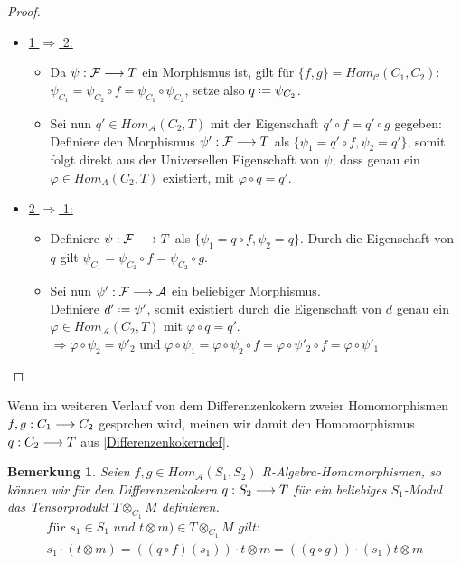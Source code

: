 \documentclass[10pt,a4paper]{report}
\newcounter{Aussage}[chapter]
\newtheorem{bem}[Aussage]{Bemerkung}
\newcommand{\functionfront}[3]{\nolinebreak{#1:#2 \longrightarrow #3}}
\newcommand{\Tensor}[3]{#1 \otimes_{#2} #3}
\newcommand{\tensor}[3]{#1 \otimes #3}
\newcommand*{\defeq}{\mathrel{\vcenter{\baselineskip0.5ex \lineskiplimit0pt
                     \hbox{\scriptsize.}\hbox{\scriptsize.}}}%
                     =}
\begin{document}
\begin{proof}
\ \\
\begin{itemize}
\item \underline{1 $\Rightarrow$ 2:}
\begin{itemize}
\item[] Da $\functionfront{\psi}{\mathcal{F}}{T}$ ein Morphismus ist, gilt für $\lbrace f,g \rbrace = Hom_{\mathcal{C}}(C_1,C_2)$:\\ $\psi_{C_1} = \psi_{C_2} \circ f = \psi_{C_1} \circ \psi_{C_2}$, setze also 
 $q  \defeq \psi_{C_2}$.
\item[] Sei nun $q' \in Hom_{\mathcal{A}}(C_2,T)$ mit der Eigenschaft $q' \circ f = q' \circ g$ gegeben:\\
 Definiere den Morphismus $\functionfront{\psi '}{\mathcal{F}}{T}$ als $\lbrace \psi_1 = q' \circ f , \psi_2 = q' \rbrace$,  somit folgt direkt aus der Universellen Eigenschaft von $\psi$, dass genau ein $\varphi \in Hom_{A}(C_2,T)$ existiert, mit $ \varphi \circ q = q '$.
\end{itemize}
\item \underline{2 $\Rightarrow$ 1:}
\begin{itemize}
\item[] Definiere $\functionfront{\psi }{\mathcal{F}}{T}$ als $\lbrace \psi_1 = q \circ f , \psi_2 = q \rbrace$.
Durch die Eigenschaft von $q$ gilt $\psi_{C_1} = \psi_{C_2} \circ f = \psi_{C_2} \circ g$.
\item[] Sei nun $\functionfront{\psi '}{\mathcal{F}}{\mathcal{A}}$ ein beliebiger Morphismus.\\
Definiere $d' \defeq \psi '$, somit existiert durch die Eigenschaft von $d$ genau ein $\varphi \in Hom_{\mathcal{A}}(C_2,T)$ mit $\varphi \circ q = q'$. \\
$\Rightarrow \varphi \circ \psi_2 = \psi '_2$ 
und $\varphi \circ \psi_1 = \varphi \circ \psi_2 \circ f = \varphi \circ \psi '_2 \circ f = \varphi \circ \psi '_1$
\end{itemize}
\end{itemize}
\end{proof}

Wenn im weiteren Verlauf von dem Differenzenkokern zweier Homomorphismen $\functionfront{f,g}{C_1}{C_2}$ gesprchen wird, meinen wir damit den Homomorphismus $\functionfront{q}{C_2}{T}$ aus \cref{Differenzenkokerndef}.

\begin{bem}
Seien $f,g \in Hom_{\mathcal{A}}(S_1,S_2)$ R-Algebra-Homomorphismen, so können wir für den Differenzenkokern $\functionfront{q}{S_2}{T}$ für ein beliebiges $S_1$-Modul das Tensorprodukt $\Tensor{T}{C_1}{M}$ definieren.
\begin{gather*}
\textit{für } s_1 \in S_1 \textit{ und } \tensor{t}{S_1}{m}) \in \Tensor{T}{C_1}{M} \textit{ gilt: }\\
s_1 \cdot (\tensor{t}{S_1}{m}) = \tensor{((q \circ f)(s_1)) \cdot t}{S_1}{m} = \tensor{((q \circ g)) \cdot (s_1)t}{S_1}{m}
\end{gather*}
\end{bem}
\end{document}
